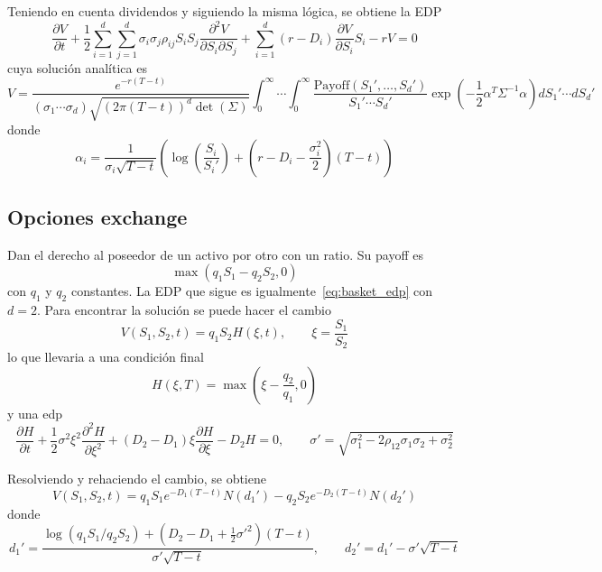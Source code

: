 Teniendo en cuenta dividendos y siguiendo la misma lógica, se obtiene la EDP
\begin{equation}\label{eq:basket_edp}
    \boxed{\frac{\partial V}{\partial t} + \frac{1}{2} \sum_{i=1}^{d} \sum_{j=1}^{d} \sigma_i \sigma_j \rho_{ij} S_i S_j \frac{\partial^2 V}{\partial S_i \partial S_j} + \sum_{i=1}^{d} (r - D_i) \frac{\partial V}{\partial S_i} S_i - r V = 0}
\end{equation}
cuya solución analítica es
\[
    \boxed{V = \frac{e^{-r(T-t)}}{(\sigma_1 \cdots \sigma_d)\sqrt{(2\pi(T-t))^{d} \det(\Sigma)}} \int_{0}^{\infty} \cdots \int_{0}^{\infty} \frac{\mathrm{Payoff}(S_1', \dots, S_d')}{S_1' \cdots S_d'} \exp\left( -\frac{1}{2} \alpha^T \Sigma^{-1} \alpha \right) dS_1' \cdots dS_d'}
\]
donde
\[
    \alpha_i = \frac{1}{\sigma_i \sqrt{T-t}} \left( \log\left( \frac{S_i}{S_i'} \right) + \left( r - D_i - \frac{\sigma_i^2}{2} \right)(T-t) \right)
\]








\subsection{Opciones exchange}
Dan el derecho al poseedor de un activo por otro con un ratio. Su payoff es
\[
    \max(q_1S_1-q_2S_2, 0)
\]
con $q_1$ y $q_2$ constantes. La EDP que sigue es igualmente~\eqref{eq:basket_edp} con $d=2$. Para encontrar la solución se puede hacer el cambio
\[
    V(S_1, S_2, t) = q_1 S_2 H(\xi, t), \qquad \xi = \frac{S_1}{S_2}
\]
lo que llevaria a una condición final
\[
    H(\xi, T) = \max\left( \xi - \frac{q_2}{q_1}, 0 \right)
\]
y una edp
\[
    \frac{\partial H}{\partial t} + \frac{1}{2} \sigma^2 \xi^2 \frac{\partial^2 H}{\partial \xi^2} + (D_2 - D_1)\xi \frac{\partial H}{\partial \xi} - D_2 H = 0, \qquad \sigma' = \sqrt{\sigma_1^2 - 2\rho_{12}\sigma_1\sigma_2 + \sigma_2^2}
\]

Resolviendo y rehaciendo el cambio, se obtiene
\[
    \boxed{V(S_1, S_2, t) = q_1 S_1 e^{-D_1(T-t)} N(d_1') - q_2 S_2 e^{-D_2(T-t)} N(d_2')}
\]
donde
\[
    d_1' = \frac{\log(q_1 S_1 / q_2 S_2) + (D_2 - D_1 + \frac{1}{2} {\sigma'}^2)(T-t)}{\sigma' \sqrt{T-t}}, \qquad d_2' = d_1' - \sigma' \sqrt{T-t}
\]







